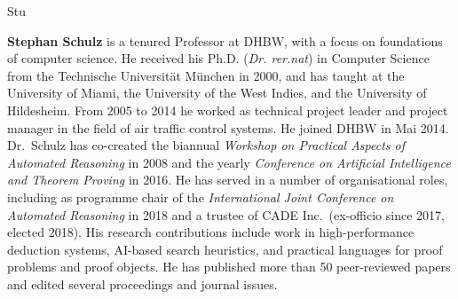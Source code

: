 \begin{sitedescription}{Stu}
\begin{compactitem}
\item \textbf{Stephan Schulz} is a tenured Professor at DHBW, with a
  focus on foundations of computer science. He received his
  Ph.D. (\emph{Dr. rer.nat}) in Computer Science from the Technische
  Universität München in 2000, and has taught at the University of
  Miami, the University of the West Indies, and the University of
  Hildesheim. From 2005 to 2014 he worked as technical project leader
  and project manager in the field of air traffic control systems. He
  joined DHBW in Mai 2014. Dr.\ Schulz has co-created the biannual
  \emph{Workshop on Practical Aspects of Automated Reasoning} in 2008
  and the yearly \emph{Conference on Artificial Intelligence and
    Theorem Proving} in 2016. He has served in a number of
  organisational roles, including as programme chair of the
  \emph{International Joint Conference on Automated Reasoning} in 2018
  and a trustee of CADE Inc.\ (ex-officio since 2017, elected
  2018). His research contributions include work in high-performance
  deduction systems, AI-based search heuristics, and practical
  languages for proof problems and proof objects. He has published
  more than 50 peer-reviewed papers and edited several proceedings and
  journal issues.
\end{compactitem}

\end{sitedescription}

